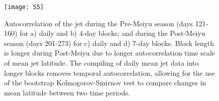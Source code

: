 \documentclass[draft,grl]{agutexSI}
\begin{document}
\begin{figure}
\centering

\noindent\texttt{[image: S5]}
\caption{Autocorrelation of the jet during the Pre-Meiyu season (days 121-160) for a) daily and b) 4-day blocks; and during the Post-Meiyu season (days 201-273) for c) daily and d) 7-day blocks. Block length is longer during Post-Meiyu due to longer autocorrelation time scale of mean jet latitude. The compiling of daily mean jet data into longer blocks removes temporal autocorrelation, allowing for the use of the bootstrap Kolmogorov-Smirnov test to compare changes in mean latitude between two time periods.}
\end{figure}
\end{document}
